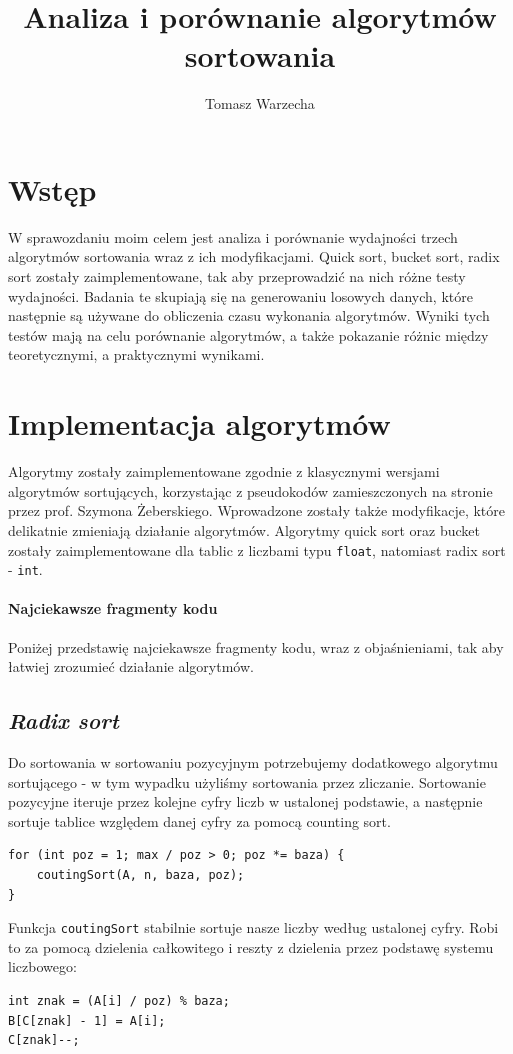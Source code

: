 \documentclass{article}
\title{Analiza i porównanie algorytmów sortowania}
\author{Tomasz Warzecha}
\begin{document}
	
	\maketitle
	
	\section{Wstęp}
W sprawozdaniu moim celem jest analiza i porównanie wydajności trzech algorytmów sortowania wraz z ich modyfikacjami. Quick sort, bucket sort, radix sort zostały zaimplementowane, tak aby przeprowadzić na nich różne testy wydajności. Badania te skupiają się na generowaniu losowych danych, które następnie są używane do obliczenia czasu wykonania algorytmów. Wyniki tych testów mają na celu porównanie algorytmów, a także pokazanie różnic między teoretycznymi, a praktycznymi wynikami. 
	
	\section{Implementacja algorytmów}
Algorytmy zostały zaimplementowane zgodnie z klasycznymi wersjami algorytmów sortujących, korzystając z pseudokodów zamieszczonych na stronie przez prof. Szymona Żeberskiego. Wprowadzone zostały także modyfikacje, które delikatnie zmieniają działanie algorytmów. Algorytmy quick sort oraz bucket zostały zaimplementowane dla tablic z liczbami typu \texttt{float}, natomiast radix sort - \texttt{int}.
	
	\paragraph{Najciekawsze fragmenty kodu\\}
	Poniżej przedstawię najciekawsze fragmenty kodu, wraz z objaśnieniami, tak aby łatwiej zrozumieć działanie algorytmów. 
	
	\subsection{\textit{Radix sort}}
	Do sortowania w sortowaniu pozycyjnym potrzebujemy dodatkowego algorytmu sortującego - w tym wypadku użyliśmy sortowania przez zliczanie. Sortowanie pozycyjne iteruje przez kolejne cyfry liczb w ustalonej podstawie, a następnie sortuje tablice względem danej cyfry za pomocą counting sort.
	\begin{lstlisting}
for (int poz = 1; max / poz > 0; poz *= baza) {
	coutingSort(A, n, baza, poz);
}
	\end{lstlisting}
	Funkcja \texttt{coutingSort} stabilnie sortuje nasze liczby według ustalonej cyfry. Robi to za pomocą dzielenia całkowitego i reszty z dzielenia przez podstawę systemu liczbowego:
	\begin{lstlisting}
int znak = (A[i] / poz) % baza;
B[C[znak] - 1] = A[i];
C[znak]--;
	\end{lstlisting}
	
\end{document}

